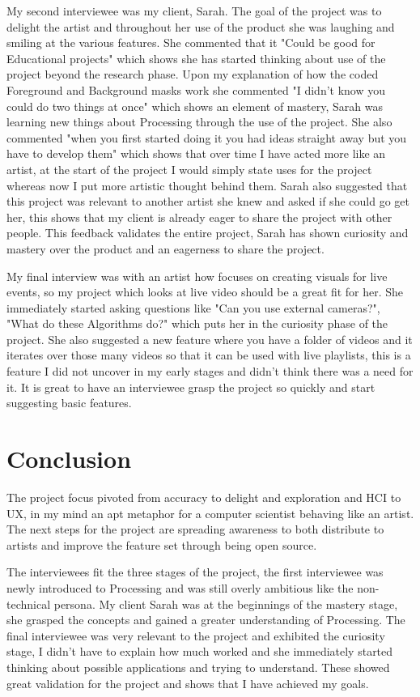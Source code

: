 \documentclass[a4paper]{report}
\begin{document}
My second interviewee was my client, Sarah. The goal of the project was to delight the artist and throughout her use of the product she was laughing and smiling at the various features. She commented that it "Could be good for Educational projects" which shows she has started thinking about use of the project beyond the research phase. Upon my explanation of how the coded Foreground and Background masks work she commented "I didn't know you could do two things at once" which shows an element of mastery, Sarah was learning new things about Processing through the use of the project. She also commented "when you first started doing it you had ideas straight away but you have to develop them" which shows that over time I have acted more like an artist, at the start of the project I would simply state uses for the project whereas now I put more artistic thought behind them. Sarah also suggested that this project was relevant to another artist she knew and asked if she could go get her, this shows that my client is already eager to share the project with other people. This feedback validates the entire project, Sarah has shown curiosity and mastery over the product and an eagerness to share the project.
    
My final interview was with an artist how focuses on creating visuals for live events, so my project which looks at live video should be a great fit for her. She immediately started asking questions like "Can you use external cameras?", "What do these Algorithms do?" which puts her in the curiosity phase of the project. She also suggested a new feature where you have a folder of videos and it iterates over those many videos so that it can be used with live playlists, this is a feature I did not uncover in my early stages and didn't think there was a need for it. It is great to have an interviewee grasp the project so quickly and start suggesting basic features.

\section{Conclusion}
The project focus pivoted from accuracy to delight and exploration and HCI to UX, in my mind an apt metaphor for a computer scientist behaving like an artist. The next steps for the project are spreading awareness to both distribute to artists and improve the feature set through being open source.

The interviewees fit the three stages of the project, the first interviewee was newly introduced to Processing and was still overly ambitious like the non-technical persona. My client Sarah was at the beginnings of the mastery stage, she grasped the concepts and gained a greater understanding of Processing. The final interviewee was very relevant to the project and exhibited the curiosity stage, I didn't have to explain how much worked and she immediately started thinking about possible applications and trying to understand. These showed great validation for the project and shows that I have achieved my goals.  
\end{document}
